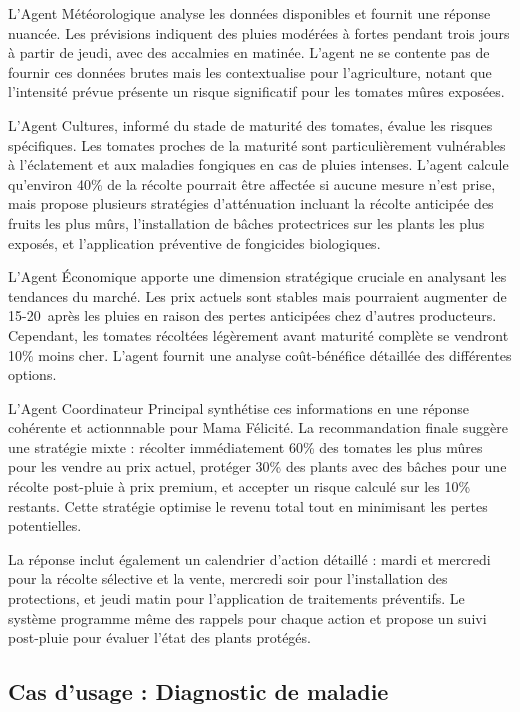 L'Agent Météorologique analyse les données disponibles et fournit une réponse nuancée. Les prévisions indiquent des pluies modérées à fortes pendant trois jours à partir de jeudi, avec des accalmies en matinée. L'agent ne se contente pas de fournir ces données brutes mais les contextualise pour l'agriculture, notant que l'intensité prévue présente un risque significatif pour les tomates mûres exposées.

L'Agent Cultures, informé du stade de maturité des tomates, évalue les risques spécifiques. Les tomates proches de la maturité sont particulièrement vulnérables à l'éclatement et aux maladies fongiques en cas de pluies intenses. L'agent calcule qu'environ 40\% de la récolte pourrait être affectée si aucune mesure n'est prise, mais propose plusieurs stratégies d'atténuation incluant la récolte anticipée des fruits les plus mûrs, l'installation de bâches protectrices sur les plants les plus exposés, et l'application préventive de fongicides biologiques.

L'Agent Économique apporte une dimension stratégique cruciale en analysant les tendances du marché. Les prix actuels sont stables mais pourraient augmenter de 15-20\ après les pluies en raison des pertes anticipées chez d'autres producteurs. Cependant, les tomates récoltées légèrement avant maturité complète se vendront 10\% moins cher. L'agent fournit une analyse coût-bénéfice détaillée des différentes options.

L'Agent Coordinateur Principal synthétise ces informations en une réponse cohérente et actionnnable pour Mama Félicité. La recommandation finale suggère une stratégie mixte : récolter immédiatement 60\% des tomates les plus mûres pour les vendre au prix actuel, protéger 30\% des plants avec des bâches pour une récolte post-pluie à prix premium, et accepter un risque calculé sur les 10\% restants. Cette stratégie optimise le revenu total tout en minimisant les pertes potentielles.

La réponse inclut également un calendrier d'action détaillé : mardi et mercredi pour la récolte sélective et la vente, mercredi soir pour l'installation des protections, et jeudi matin pour l'application de traitements préventifs. Le système programme même des rappels pour chaque action et propose un suivi post-pluie pour évaluer l'état des plants protégés.

\subsection{Cas d'usage : Diagnostic de maladie}

